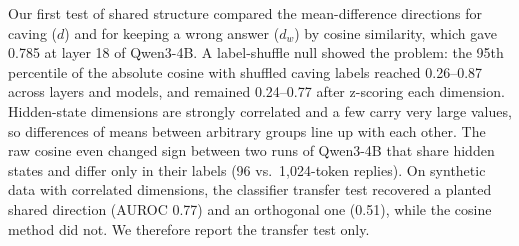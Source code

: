 Our first test of shared structure compared the mean-difference directions for caving ($d$) and for keeping a wrong answer ($d_w$) by cosine similarity, which gave 0.785 at layer 18 of Qwen3-4B. A label-shuffle null showed the problem: the 95th percentile of the absolute cosine with shuffled caving labels reached 0.26--0.87 across layers and models, and remained 0.24--0.77 after z-scoring each dimension. Hidden-state dimensions are strongly correlated and a few carry very large values, so differences of means between arbitrary groups line up with each other. The raw cosine even changed sign between two runs of Qwen3-4B that share hidden states and differ only in their labels (96 vs.\ 1{,}024-token replies). On synthetic data with correlated dimensions, the classifier transfer test recovered a planted shared direction (AUROC 0.77) and an orthogonal one (0.51), while the cosine method did not. We therefore report the transfer test only.
